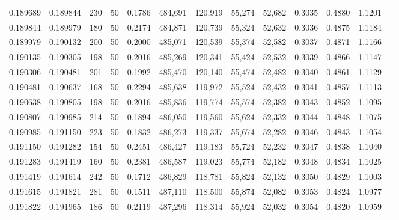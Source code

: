 \begin{tabular}{rrrrrrrrrrrrr}
0.189689 & 0.189844 &   230 &  50 &                                     0.1786 & 484,691 & 120,919 &  55,274 &  52,682 & 0.3035 & 0.4880 & 1.1201 \\
0.189844 & 0.189979 &   180 &  50 &                                     0.2174 & 484,871 & 120,739 &  55,324 &  52,632 & 0.3036 & 0.4875 & 1.1184 \\
0.189979 & 0.190132 &   200 &  50 &                                     0.2000 & 485,071 & 120,539 &  55,374 &  52,582 & 0.3037 & 0.4871 & 1.1166 \\
0.190135 & 0.190305 &   198 &  50 &                                     0.2016 & 485,269 & 120,341 &  55,424 &  52,532 & 0.3039 & 0.4866 & 1.1147 \\
0.190306 & 0.190481 &   201 &  50 &                                     0.1992 & 485,470 & 120,140 &  55,474 &  52,482 & 0.3040 & 0.4861 & 1.1129 \\
0.190481 & 0.190637 &   168 &  50 &                                     0.2294 & 485,638 & 119,972 &  55,524 &  52,432 & 0.3041 & 0.4857 & 1.1113 \\
0.190638 & 0.190805 &   198 &  50 &                                     0.2016 & 485,836 & 119,774 &  55,574 &  52,382 & 0.3043 & 0.4852 & 1.1095 \\
0.190807 & 0.190985 &   214 &  50 &                                     0.1894 & 486,050 & 119,560 &  55,624 &  52,332 & 0.3044 & 0.4848 & 1.1075 \\
0.190985 & 0.191150 &   223 &  50 &                                     0.1832 & 486,273 & 119,337 &  55,674 &  52,282 & 0.3046 & 0.4843 & 1.1054 \\
0.191150 & 0.191282 &   154 &  50 &                                     0.2451 & 486,427 & 119,183 &  55,724 &  52,232 & 0.3047 & 0.4838 & 1.1040 \\
0.191283 & 0.191419 &   160 &  50 &                                     0.2381 & 486,587 & 119,023 &  55,774 &  52,182 & 0.3048 & 0.4834 & 1.1025 \\
0.191419 & 0.191614 &   242 &  50 &                                     0.1712 & 486,829 & 118,781 &  55,824 &  52,132 & 0.3050 & 0.4829 & 1.1003 \\
0.191615 & 0.191821 &   281 &  50 &                                     0.1511 & 487,110 & 118,500 &  55,874 &  52,082 & 0.3053 & 0.4824 & 1.0977 \\
0.191822 & 0.191965 &   186 &  50 &                                     0.2119 & 487,296 & 118,314 &  55,924 &  52,032 & 0.3054 & 0.4820 & 1.0959 \\

\end{tabular}
